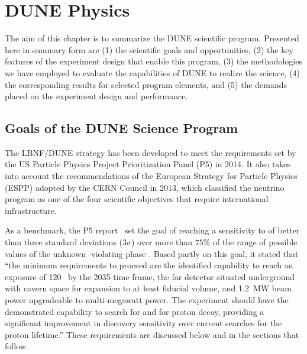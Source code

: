 \chapter{DUNE Physics}
\label{ch:exec-phys}


%

The aim of this chapter is to summarize the 
DUNE scientific program.  
%
%
Presented here in summary form are   
(1) the scientific goals and opportunities, 
(2) the key features of the experiment 
design that enable this program, 
(3) the methodologies we have 
employed to evaluate the capabilities of DUNE to realize 
the science, 
(4) the corresponding results for selected program elements, 
and (5) the demands placed on the experiment design and 
performance.

\section{Goals of the DUNE Science Program}
\label{sec:exec-phys-key-goals}

The LBNF/DUNE strategy has been developed to meet the
requirements set by the US Particle Physics Project Prioritization Panel
(P5) in 2014. It also takes into account the recommendations
of the European Strategy for Particle Physics (ESPP) adopted
by the CERN Council in 2013, which classified the 
neutrino program as one of the four scientific objectives that
require international infrastructure.

As a benchmark, the P5 report~\cite{p5report2014} set the goal of
reaching a sensitivity to  of better than three
standard deviations (\num{3}$\sigma$) over more than $75\%$
of the range of possible values of the unknown
-violating phase \deltacp.
Based partly on this goal, it stated that ``the
minimum requirements to proceed are the identified capability
to reach an exposure of \num{120}~\ktMWyr{} by the 2035 time
frame, the far detector situated underground with cavern space
for expansion to at least \fdfiducialmass \lar fiducial volume,
and \SI{1.2}{MW} beam power upgradeable to multi-megawatt power.
The experiment should have the demonstrated capability to
search for  and for proton decay, providing a
significant improvement in discovery sensitivity over current
searches for the proton lifetime.''
These requirements are discussed below and in the sections
that follow.

